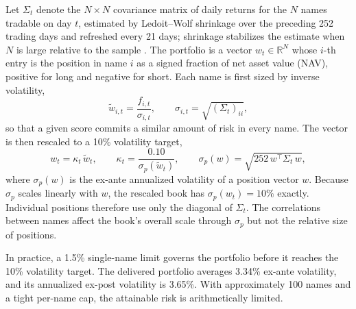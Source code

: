 \documentclass[11pt]{article}
\begin{document}
Let $\Sigma_t$ denote the $N\times N$ covariance matrix of daily returns for the $N$ names tradable on day $t$, estimated by Ledoit--Wolf shrinkage over the preceding 252 trading days and refreshed every 21 days; shrinkage stabilizes the estimate when $N$ is large relative to the sample \citep{ledoitwolf2004}. The portfolio is a vector $w_t\in\mathbb{R}^N$ whose $i$-th entry is the position in name $i$ as a signed fraction of net asset value (NAV), positive for long and negative for short. Each name is first sized by inverse volatility,
\begin{equation}
 \tilde w_{i,t}=\frac{f_{i,t}}{\sigma_{i,t}},\qquad \sigma_{i,t}=\sqrt{(\Sigma_t)_{ii}},
\end{equation}
so that a given score commits a similar amount of risk in every name. The vector is then rescaled to a 10\% volatility target,
\begin{equation}
 w_t=\kappa_t\,\tilde w_t,\qquad
 \kappa_t=\frac{0.10}{\sigma_p(\tilde w_t)},\qquad
 \sigma_p(w)=\sqrt{252\,w^\top\Sigma_t\,w},
\end{equation}
where $\sigma_p(w)$ is the ex-ante annualized volatility of a position vector $w$. Because $\sigma_p$ scales linearly with $w$, the rescaled book has $\sigma_p(w_t)=10\%$ exactly. Individual positions therefore use only the diagonal of $\Sigma_t$. The correlations between names affect the book's overall scale through $\sigma_p$ but not the relative size of positions.

In practice, a 1.5\% single-name limit governs the portfolio before it reaches the 10\% volatility target. The delivered portfolio averages 3.34\% ex-ante volatility, and its annualized ex-post volatility is 3.65\%. With approximately 100 names and a tight per-name cap, the attainable risk is arithmetically limited.
\end{document}
